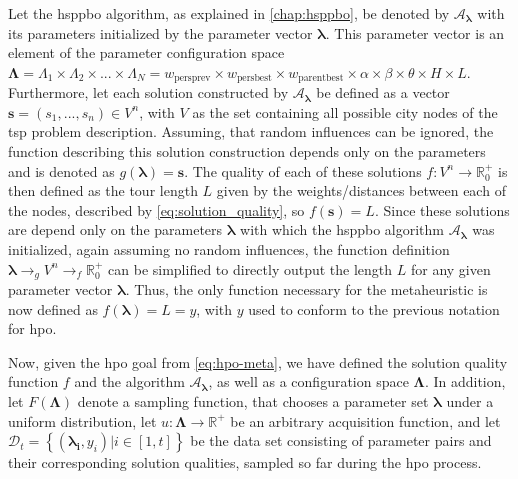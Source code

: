 Let the \gls{hsppbo} algorithm, as explained in \cref{chap:hsppbo}, be denoted by $\mathcal{A}_\mathbf{\lambda}$ with its parameters initialized by the parameter vector $\mathbf{\lambda}$. This parameter vector is an element of the parameter configuration space $\mathbf{\Lambda} = \Lambda_1 \times \Lambda_2 \times ... \times \Lambda_N = w_{\text{persprev}} \times w_{\text{persbest}} \times w_{\text{parentbest}} \times \alpha \times \beta \times \theta \times H \times L$. Furthermore, let each solution constructed by $\mathcal{A}_\mathbf{\lambda}$ be defined as a vector $\mathbf{s} = (s_1,...,s_n) \in V^n$, with $V$ as the set containing all possible city nodes of the \gls{tsp} problem description. Assuming, that random influences can be ignored, the function describing this solution construction depends only on the parameters and is denoted as $g(\mathbf{\lambda}) = \mathbf{s}$. The quality of each of these solutions $f : V^n \rightarrow \mathbb{R}_{0}^{+}$ is then defined as the tour length $L$ given by the weights/distances between each of the nodes, described by \cref{eq:solution_quality}, so $f(\mathbf{s}) = L$. Since these solutions are depend only on the parameters $\mathbf{\lambda}$ with which the \gls{hsppbo} algorithm $\mathcal{A}_\mathbf{\lambda}$ was initialized, again assuming no random influences, the function definition  $\mathbf{\lambda} \to_{g} V^n \to_{f} \mathbb{R}_{0}^{+}$ can be simplified to directly output the length $L$ for any given parameter vector $\mathbf{\lambda}$. Thus, the only function necessary for the metaheuristic is now defined as $f(\mathbf{\lambda}) = L = y$, with $y$ used to conform to the previous notation for \gls{hpo}.

Now, given the \glsdesc{hpo} goal from \cref{eq:hpo-meta}, we have defined the solution quality function $f$ and the algorithm $\mathcal{A}_\mathbf{\lambda}$, as well as a configuration space $\mathbf{\Lambda} $. In addition, let $F(\mathbf{\Lambda})$ denote a sampling function, that chooses a parameter set $\mathbf{\lambda}$ under a uniform distribution, let $u: \mathbf{\Lambda} \to \mathbb{R}^+$ be an arbitrary acquisition function, and let $\mathcal{D}_t = \left\lbrace (\mathbf{\lambda_i}, y_i) |  i\in [1,t] \right\rbrace $ be the data set consisting of parameter pairs and their corresponding solution qualities, sampled so far during the \gls{hpo} process.

